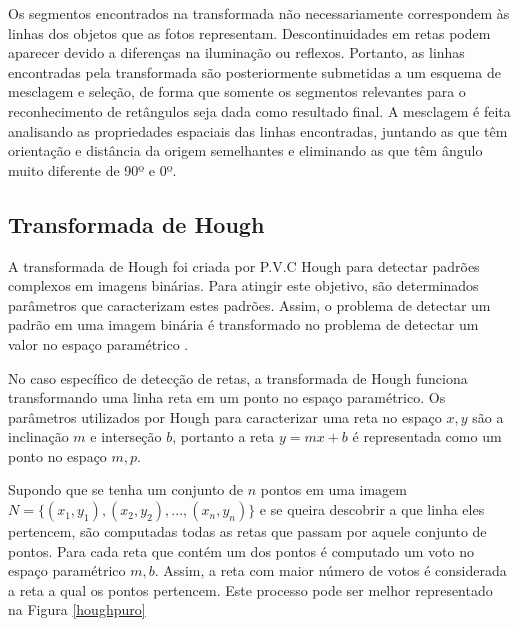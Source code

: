 Os segmentos encontrados na transformada não necessariamente correspondem às linhas dos objetos que as fotos representam. Descontinuidades em retas podem aparecer devido a diferenças na iluminação ou reflexos. Portanto, as linhas encontradas pela transformada são posteriormente submetidas a um esquema de  mesclagem e seleção, de forma que somente os segmentos relevantes para o reconhecimento de retângulos seja dada como resultado final. A mesclagem é feita analisando as propriedades espaciais das linhas encontradas, juntando as que têm orientação e distância da origem semelhantes e eliminando as que têm ângulo muito diferente de 90º e 0º.

\subsection{Transformada de Hough}


A transformada de Hough foi criada por P.V.C Hough para detectar padrões complexos em imagens binárias. Para atingir este objetivo, são determinados parâmetros que caracterizam estes padrões. Assim, o problema de detectar um padrão em uma imagem binária é transformado no problema de detectar um valor no espaço paramétrico \cite{houghintro01}.


No caso específico de detecção de retas, a transformada de Hough funciona transformando uma linha reta em um ponto no espaço paramétrico. Os parâmetros utilizados por Hough para caracterizar uma reta no espaço $x,y$ são a inclinação $m$ e interseção $b$, portanto a reta $y = mx+b$ é representada como um ponto no espaço $m,p$.

Supondo que se tenha um conjunto de $n$ pontos em uma imagem $N = \{(x_1,y_1),(x_2,y_2),...,(x_n,y_n)\}$  e se queira descobrir a que linha eles pertencem, são computadas todas as retas que passam por aquele conjunto de pontos. Para cada reta que contém um dos pontos é computado um voto no espaço paramétrico $m,b$. Assim, a reta com maior número de votos é considerada a reta a qual os pontos pertencem. Este processo pode ser melhor representado na Figura \ref{houghpuro}

